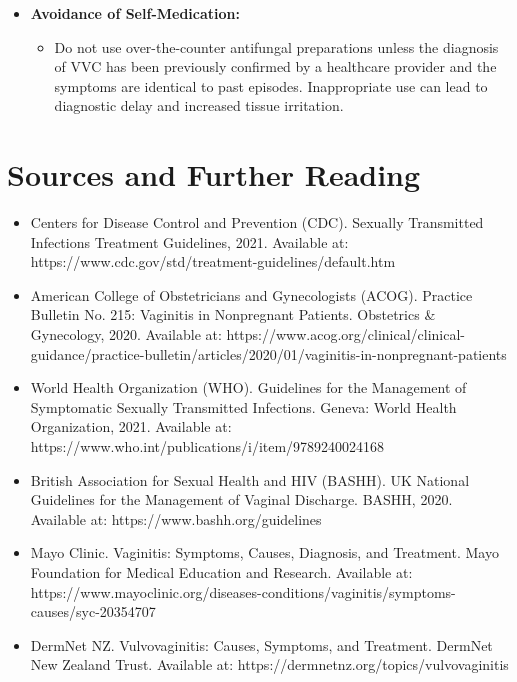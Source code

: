 \begin{itemize}
\begin{itemize}
        \item Maintain optimal glycemic control, especially for individuals with diabetes, as high blood glucose levels promote \textit{Candida} colonization and growth.
        \item Although clinical evidence is mixed, some individuals find that oral or vaginal probiotics containing \textit{Lactobacillus} species help maintain a healthy vaginal microbiome, particularly during or after a course of systemic antibiotics.
    \end{itemize}
    \item \textbf{Avoidance of Self-Medication:}
    \begin{itemize}
        \item Do not use over-the-counter antifungal preparations unless the diagnosis of VVC has been previously confirmed by a healthcare provider and the symptoms are identical to past episodes. Inappropriate use can lead to diagnostic delay and increased tissue irritation.
    \end{itemize}
\end{itemize}

\section*{Sources and Further Reading}
\begin{itemize}
    \item Centers for Disease Control and Prevention (CDC). Sexually Transmitted Infections Treatment Guidelines, 2021. Available at: https://www.cdc.gov/std/treatment-guidelines/default.htm
    \item American College of Obstetricians and Gynecologists (ACOG). Practice Bulletin No. 215: Vaginitis in Nonpregnant Patients. Obstetrics \& Gynecology, 2020. Available at: https://www.acog.org/clinical/clinical-guidance/practice-bulletin/articles/2020/01/vaginitis-in-nonpregnant-patients
    \item World Health Organization (WHO). Guidelines for the Management of Symptomatic Sexually Transmitted Infections. Geneva: World Health Organization, 2021. Available at: https://www.who.int/publications/i/item/9789240024168
    \item British Association for Sexual Health and HIV (BASHH). UK National Guidelines for the Management of Vaginal Discharge. BASHH, 2020. Available at: https://www.bashh.org/guidelines
    \item Mayo Clinic. Vaginitis: Symptoms, Causes, Diagnosis, and Treatment. Mayo Foundation for Medical Education and Research. Available at: https://www.mayoclinic.org/diseases-conditions/vaginitis/symptoms-causes/syc-20354707
    \item DermNet NZ. Vulvovaginitis: Causes, Symptoms, and Treatment. DermNet New Zealand Trust. Available at: https://dermnetnz.org/topics/vulvovaginitis
\end{itemize}